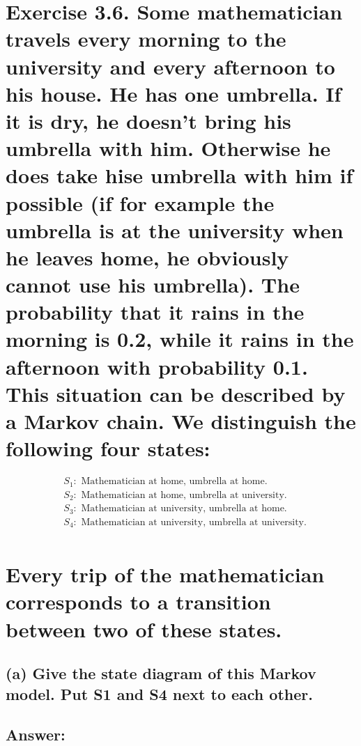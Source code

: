 \documentclass[11px]{article}
\begin{document}
\section*{Exercise 3.6. \normalfont Some mathematician travels every morning to the university and every afternoon to his house. He has one umbrella. If it is dry, he doesn't bring his umbrella with him. Otherwise he does take hise umbrella with him if possible (if for example the umbrella is at the university when he leaves home, he obviously cannot use his umbrella). The probability that it rains in the morning is 0.2, while it rains in the afternoon with probability 0.1. This situation can be described by a Markov chain. We distinguish the following four states:}

\begin{equation}
\begin{split}
& S_1: \text{ Mathematician at home, umbrella at home.} \\
& S_2: \text{ Mathematician at home, umbrella at university.} \\
& S_3: \text{ Mathematician at university, umbrella at home.} \\
& S_4: \text{ Mathematician at university, umbrella at university.} \\
\end{split}
\end{equation}

\section*{\normalfont Every trip of the mathematician corresponds to a transition between two of these states.}

\subsection*{\normalfont (a) Give the state diagram of this Markov model. Put S1 and S4 next to each other.}

\subsection*{Answer: }

\begin{center}
\end{center}
\end{document}

